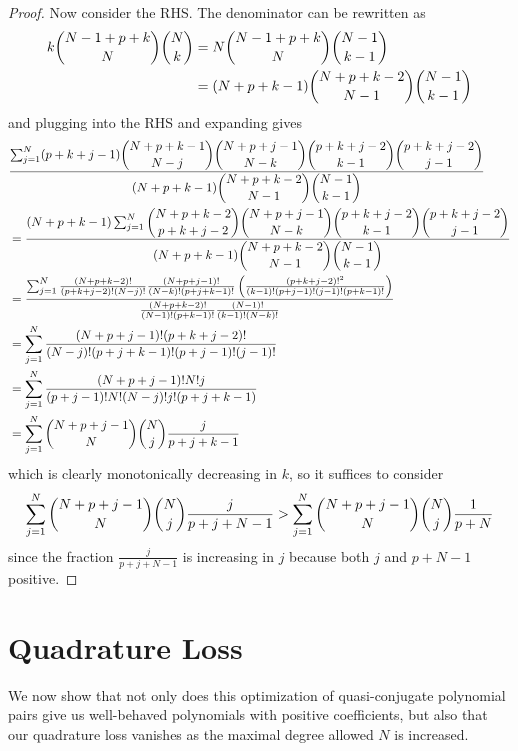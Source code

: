 \documentclass[11pt]{article}
\theoremstyle{definition}
\theoremstyle{remark}
\numberwithin{equation}{section}
\begin{document}
\begin{proof}
Now consider the RHS. The denominator can be rewritten as 
\begin{align*} 
k \dbinom{N-1+p+k}{N}\dbinom{N}{k} &= N \dbinom{N-1+p+k}{N}\dbinom{N-1}{k-1} \\ 
&= (N+p+k-1) \dbinom{N+p+k-2}{N-1} \dbinom{N-1}{k-1} 
\end{align*} and plugging into the RHS and expanding gives 
\begin{align*}
&\frac{\sum_{j=1}^N (p+k+j-1) \dbinom{N+p+k-1}{N-j} \dbinom{N+p+j-1}{N-k} \dbinom{p+k+j-2}{k-1} \dbinom{p+k+j-2}{j-1} }{ (N+p+k-1) \dbinom{N+p+k-2}{N-1} \dbinom{N-1}{k-1} }  \\
&= \frac{ (N+p+k-1)\sum_{j=1}^N  \dbinom{N+p+k-2}{p+k+j-2} \dbinom{N+p+j-1}{N-k} \dbinom{p+k+j-2}{k-1} \dbinom{p+k+j-2}{j-1} }{ (N+p+k-1) \dbinom{N+p+k-2}{N-1} \dbinom{N-1}{k-1} }  \\
&= \frac{\sum_{j=1}^N \frac{(N+p+k-2)!}{(p+k+j-2)!(N-j)!} \frac{(N+p+j-1)!}{(N-k)! (p+j+k-1)!} \left(\frac{(p+k+j-2)!^2}{(k-1)! (p+j-1)!(j-1)!(p+k-1)!}\right)}{\frac{(N+p+k-2)!}{(N-1)! (p+k-1)!} \frac{(N-1)!}{(k-1)! (N-k)!}}
\\
&= \sum_{j=1}^N \frac{(N+p+j-1)! (p+k+j-2)!}{(N-j)!(p+j+k-1)!(p+j-1)!(j-1)!}\\
&= \sum_{j=1}^N \frac{(N+p+j-1)!N! j}{(p+j-1)!N!(N-j)!j! (p+j+k-1)}\\
&= \sum_{j=1}^N \dbinom{N+p+j-1}{N} \dbinom{N}{j} \frac{j}{p+j+k-1}
\end{align*} which is clearly monotonically decreasing in $k$, so it suffices to consider 
\begin{align*}
\sum_{j=1}^N \dbinom{N+p+j-1}{N} \dbinom{N}{j} \frac{j}{p+j+N-1} > \sum_{j=1}^N \dbinom{N+p+j-1}{N} \dbinom{N}{j}\frac{1}{p+N}
\end{align*} since the fraction $\frac{j}{p+j+N-1}$ is increasing in $j$ because both $j$ and $p+N-1$ positive.
\end{proof}

\section{Quadrature Loss}
We now show that not only does this optimization of quasi-conjugate polynomial pairs give us well-behaved polynomials with positive coefficients, but also that our quadrature loss vanishes as the maximal degree allowed $N$ is increased. 
\end{document}
